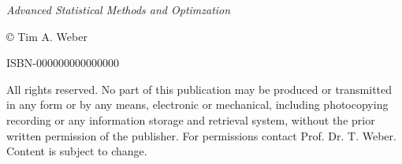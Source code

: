 \null\vfill
\begin{flushleft}
\thispagestyle{empty}
\textit{Advanced Statistical Methods and Optimzation}

© Tim A. Weber

ISBN-000000000000000

\noindent All rights reserved. No part of this publication may be produced or transmitted in any form or by any means, electronic or mechanical, including photocopying recording or any information storage and retrieval system, without the prior written permission of the publisher. For permissions contact Prof. Dr. T. Weber. Content is subject to change.
\end{flushleft}
